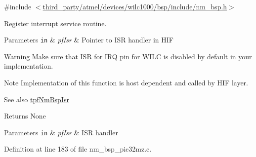 {\ttfamily \#include $<$\hyperlink{nm__bsp_8h}{third\+\_\+party/atmel/devices/wilc1000/bsp/include/nm\+\_\+bsp.\+h}$>$}



Register interrupt service routine. 


\begin{DoxyParams}[1]{Parameters}
\mbox{\tt in}  & {\em pf\+Isr} & Pointer to I\+SR handler in H\+IF \\
\hline
\end{DoxyParams}
\begin{DoxyWarning}{Warning}
Make sure that I\+SR for I\+RQ pin for W\+I\+LC is disabled by default in your implementation. 
\end{DoxyWarning}
\begin{DoxyNote}{Note}
Implementation of this function is host dependent and called by H\+IF layer. 
\end{DoxyNote}
\begin{DoxySeeAlso}{See also}
\hyperlink{group__BSPDefine_gab061a1639662a3114b4c8b3b39bd6848}{tpf\+Nm\+Bsp\+Isr} 
\end{DoxySeeAlso}
\begin{DoxyReturn}{Returns}
None
\end{DoxyReturn}

\begin{DoxyParams}[1]{Parameters}
\mbox{\tt in}  & {\em pf\+Isr} & I\+SR handler \\
\hline
\end{DoxyParams}


Definition at line 183 of file nm\+\_\+bsp\+\_\+pic32mz.\+c.


